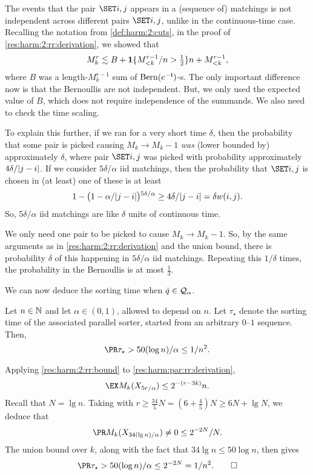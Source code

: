 \documentclass{article}
\begin{document}
\begin{Proof}
The events that the pair $\set{i,j}$ appears in a (sequence of) matchings is not independent across different pairs $\set{i,j}$, unlike in the continuous-time case.
Recalling the notation from \cref{def:harm:2:cuts},
in the proof of \cref{res:harm:2:rr:derivation}, we showed that
\[
	M_k^r
\lesssim
	B
+	\bm1\{  M_{< k}^{r-1}/n > \tfrac12  \} n
+	M_{< k}^{r-1},
\]
where $B$ was a length-$M_k^{r-1}$ sum of $\operatorname{Bern}(e^{-\mathfrak{t}})$-s.
The only important difference now is that the Bernoullis are not independent. But, we only used the expected value of $B$, which does not require independence of the summands.
We also need to check the time scaling.

To explain this further, if we ran for a very short time $\delta$, then the probability that some pair is picked causing $M_k \to M_k - 1$ \emph{was} (lower bounded by) approximately $\delta$, where pair $\set{i,j}$ was picked with probability approximately $4 \delta / | j - i |$.
If we consider $5 \delta / \alpha$ iid matchings, then the probability that $\set{i,j}$ is chosen in (at least) one of these is at least
\[
	1 - \bigl(  1 - \alpha / | j - i |  \bigr){}^{5 \delta / \alpha}
\ge
	4 \delta / | j - i |
=
	\delta w(i,j).
\]
So, $5 \delta / \alpha$ iid matchings are like $\delta$ units of continuous time.

We only need one pair to be picked to cause $M_k \to M_k - 1$.
So, by the same arguments as in \cref{res:harm:2:rr:derivation} and the union bound, there is probability $\delta$ of this happening in $5 \delta / \alpha$ iid matchings.
Repeating this $1/\delta$ times, the probability in the Bernoullis is at most $\tfrac13$.
\end{Proof}

We can now deduce the sorting time when $\tilde q \in \mathcal{Q}_\alpha$.

\begin{prop}
\label{res:harm:par:sorting-gen}
Let $n \in \mathbb{N}$ and let $\alpha \in (0,1)$, allowed to depend on $n$.
Let $\tau_\star$ denote the sorting time of the associated parallel sorter, started from an arbitrary $0$--$1$ sequence.
Then,
\[
	\pr{ \tau_\star > 50 (\log n) / \alpha }
\le
	1/n^2.
\]
\end{prop}

\begin{Proof}
Applying \cref{res:harm:2:rr:bound} to \cref{res:harm:par:rr:derivation},
\[
	\ex{ M_k(X_{5 r / \alpha}) }
\le
	2^{-(r - 3k)} n.
\]
Recall that $N = \lg n$.
Taking with $r \ge \tfrac{34}5 N = (6 + \tfrac45) N \ge 6 N + \lg N$, we deduce that
\[
	\pr{ M_k(X_{34 (\lg n) / \alpha}) \ne 0 }
\le
	2^{-2N} / N.
\]
The union bound over $k$, along with the fact that $34 \lg n \le 50 \log n$, then gives
\[
	\pr{ \tau_\star > 50 (\log n) / \alpha }
\le
	2^{-2N}
=
	1/n^2.
\qedhere
\]
\end{Proof}
\end{document}

